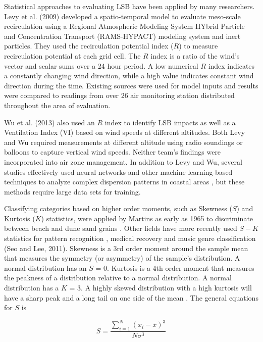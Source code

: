 Statistical approaches to evaluating LSB have been applied by many researchers.  Levy et al. (2009) developed a spatio-temporal model to evaluate meso-scale recirculation using a Regional Atmospheric Modeling System HYbrid Particle and Concentration Transport (RAMS-HYPACT) modeling system and inert particles.  They used the recirculation potential index ($R$) to measure recirculation potential at each grid cell.  The $R$ index is a ratio of the wind’s vector and scalar sums over a 24 hour period.  A low numerical $R$ index indicates a constantly changing wind direction, while a high value indicates constant wind direction during the time.  Existing sources were used for model inputs and results were compared to readings from over 26 air monitoring station distributed throughout the area of evaluation.  

Wu et al. (2013) also used an $R$ index to identify LSB impacts as well as a Ventilation Index (VI) based on wind speeds at different altitudes.  Both Levy and Wu required measurements at different altitude using radio soundings or balloons to capture vertical wind speeds.  Neither team’s findings were incorporated into air zone management.  In addition to Levy and Wu, several studies effectively used neural networks and other machine learning-based techniques to analyze complex dispersion patterns in coastal areas \citep{Elangasinghe2014, Feng2015}, but these methods require large data sets for training. 

Classifying categories based on higher order moments, such as Skewness ($S$) and Kurtosis ($K$) statistics, were applied by Martins as early as 1965 to discriminate between beach and dune sand grains \citep{Martins1965}.  Other fields have more recently used $S-K$ statistics for pattern recognition \citep{Crosilla2013}, medical recovery \citep{Chi2008} and music genre classification (Seo and Lee, 2011).  Skewness is a 3rd order moment around the sample mean that measures the symmetry (or asymmetry) of the sample’s distribution. A normal distribution has an $S$ = 0. Kurtosis is a 4th order moment that measures the peakness of a distribution relative to a normal distribution. A normal distribution has a $K$ = 3. A highly skewed distribution with a high kurtosis will have a sharp peak and a long tail on one side of the mean \citep{NIST2016}.  The general equations for $S$ is

\begin{equation}
\label{eq:skewness}
S = \frac{\sum_{i=1}^{N}\left (x_{i}-\bar{x} \right )^{3}}{N\sigma^{3}}
\end{equation}

